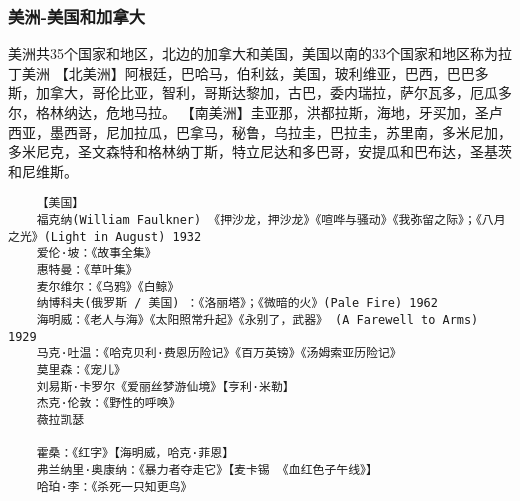 \documentclass[UTF8]{../RepresentationUniverse}
\begin{document}
\subsubsection{美洲-美国和加拿大}
美洲共35个国家和地区，北边的加拿大和美国，美国以南的33个国家和地区称为拉丁美洲
    【北美洲】阿根廷，巴哈马，伯利兹，美国，玻利维亚，巴西，巴巴多斯，加拿大，哥伦比亚，智利，哥斯达黎加，古巴，委内瑞拉，萨尔瓦多，厄瓜多尔，格林纳达，危地马拉。
    【南美洲】圭亚那，洪都拉斯，海地，牙买加，圣卢西亚，墨西哥，尼加拉瓜，巴拿马，秘鲁，乌拉圭，巴拉圭，苏里南，多米尼加，多米尼克，圣文森特和格林纳丁斯，特立尼达和多巴哥，安提瓜和巴布达，圣基茨和尼维斯。
\begin{lstlisting}
    【美国】
    福克纳(William Faulkner) 《押沙龙，押沙龙》《喧哗与骚动》《我弥留之际》；《八月之光》(Light in August) 1932
    爱伦·坡：《故事全集》
    惠特曼：《草叶集》
    麦尔维尔：《乌鸦》《白鲸》
    纳博科夫(俄罗斯 / 美国) ：《洛丽塔》；《微暗的火》(Pale Fire) 1962
    海明威：《老人与海》《太阳照常升起》《永别了，武器》 (A Farewell to Arms) 1929
    马克·吐温：《哈克贝利·费恩历险记》《百万英镑》《汤姆索亚历险记》
    莫里森：《宠儿》
    刘易斯·卡罗尔《爱丽丝梦游仙境》【亨利·米勒】
    杰克·伦敦：《野性的呼唤》
    薇拉凯瑟

    霍桑：《红字》【海明威，哈克·菲恩】
    弗兰纳里·奥康纳：《暴力者夺走它》【麦卡锡 《血红色子午线》】
    哈珀·李：《杀死一只知更鸟》


\end{lstlisting}
\end{document}
